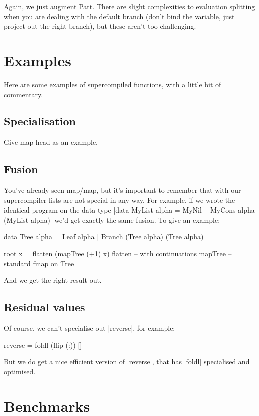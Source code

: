 \documentclass{sigplanconf}
\begin{document}
Again, we just augment Patt. There are slight complexities to evaluation splitting when you are dealing with the default branch (don't bind the variable, just project out the right branch), but these aren't too challenging.

\section{Examples}
\label{sec:examples}

Here are some examples of supercompiled functions, with a little bit of commentary.

\subsection{Specialisation}

Give map head as an example.

\subsection{Fusion}

You've already seen map/map, but it's important to remember that with our supercompiler lists are not special in any way. For example, if we wrote the identical program on the data type |data MyList alpha = MyNil || MyCons alpha (MyList alpha)| we'd get exactly the same fusion. To give an example:

\begin{code}
data Tree alpha = Leaf alpha | Branch (Tree alpha) (Tree alpha)

root x = flatten (mapTree (+1) x)
flatten -- with continuations
mapTree -- standard fmap on Tree
\end{code}

And we get the right result out.

\subsection{Residual values}

Of course, we can't specialise out |reverse|, for example:

\begin{code}
reverse = foldl (flip (:)) []
\end{code}

But we do get a nice efficient version of |reverse|, that has |foldl| specialised and optimised.

\section{Benchmarks}
\label{sec:benchmarks}
\end{document}
